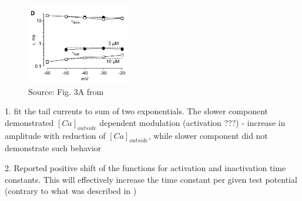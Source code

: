 \documentclass[11pt]{article}
\begin{document}
\begin{figure}
    \vspace{-1.1\baselineskip}
    \includegraphics[width=0.4\textwidth]{img/2025_01_15/ca_modul_of_t_type_khan.png}
    \caption{Source: Fig. 3A from \cite{gonzalo-gomezIhCurrentNecessary2012}}
\end{figure}
1. \cite{khanPermeationGatingCaV312008} fit the tail currents to sum of
two exponentials. The slower component demonstrated $[Ca]_{outside}$ dependent
modulation (activation ???) - increase in amplitude with reduction of $[Ca]_{outside}$, while slower
component did not demonstrate such behavior

2. \cite{talaveraExtracellularCa2Modulates2003} Reported positive
shift of the functions for activation and inactivation time constants. This will
effectively increase the time constant per given test potential (contrary to what
was described in \cite{khanPermeationGatingCaV312008})

\vspace{1.3cm}
\end{document}

